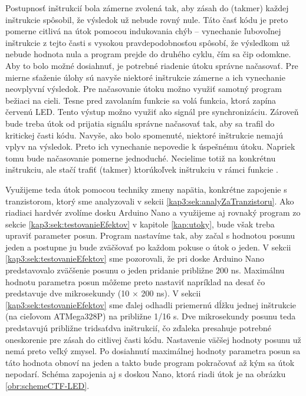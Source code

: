 Postupnosť inštrukcií bola zámerne zvolená tak, aby zásah do (takmer) každej inštrukcie spôsobil, že výsledok už nebude rovný nule. Táto časť kódu je preto pomerne citlivá na útok pomocou indukovania chýb -- vynechanie ľubovoľnej inštrukcie z tejto časti s vysokou pravdepodobnosťou spôsobí, že výsledkom už nebude hodnota nula a program prejde do druhého cyklu, čím sa čip odomkne. Aby to bolo možné dosiahnuť, je potrebné riadenie útoku správne načasovať. Pre mierne sťaženie úlohy sú navyše niektoré inštrukcie zámerne  a ich vynechanie neovplyvní výsledok. Pre načasovanie útoku možno využiť samotný program bežiaci na cieli. Tesne pred zavolaním funkcie  sa volá funkcia, ktorá zapína červenú LED. Tento výstup možno využiť ako signál pre synchronizáciu. Zároveň bude treba útok od prijatia signálu správne načasovať tak, aby sa trafil do kritickej časti kódu. Navyše, ako bolo spomenuté, niektoré inštrukcie nemajú vplyv na výsledok. Preto ich vynechanie nepovedie k úspešnému útoku. Napriek tomu bude načasovanie pomerne jednoduché. Necielime totiž na konkrétnu inštrukciu, ale stačí trafiť (takmer) ktorúkoľvek inštrukciu v rámci funkcie .

Využijeme teda útok pomocou techniky zmeny napätia, konkrétne zapojenie s tranzistorom, ktorý sme analyzovali v sekcii \ref{kap3:sek:analyZaTranzistoru}. Ako riadiaci hardvér zvolíme dosku Arduino Nano a využijeme aj rovnaký program zo sekcie \ref{kap3:sek:testovanieEfektov} v kapitole \ref{kap:utoky}, bude však treba upraviť parameter posun. Program nastavíme tak, aby začal s hodnotou posunu jeden a postupne ju bude zväčšovať po každom pokuse o útok o jeden. V sekcii \ref{kap3:sek:testovanieEfektov} sme pozorovali, že pri doske Arduino Nano predstavovalo zväčšenie posunu o jeden pridanie približne 200 ns. Maximálnu hodnotu parametra posun môžeme preto nastaviť napríklad na desať čo predstavuje dve mikrosekundy (10 $\times$ 200 ns). V sekcii \ref{kap3:sek:testovanieEfektov} sme ďalej odhadli priemernú dĺžku jednej inštrukcie (na cieľovom ATMega328P) na približne 1/16 \textmu s. Dve mikrosekundy posunu teda predstavujú približne tridsaťdva inštrukcií, čo zďaleka presahuje potrebné oneskorenie pre zásah do citlivej časti kódu. Nastavenie väčšej hodnoty posunu už nemá preto veľký zmysel. Po dosiahnutí maximálnej hodnoty parametra posun sa táto hodnota obnoví na jeden a takto bude program pokračovať až kým sa útok nepodarí. Schéma zapojenia aj s doskou Nano, ktorá riadi útok je na obrázku \ref{obr:schemeCTF-LED}.

